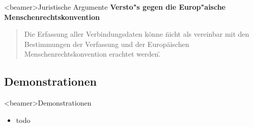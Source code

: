     \begin{frame}<beamer>{Juristische Argumente}
      \textbf{Versto"s gegen die Europ"aische Menschenrechtskonvention}
      \begin{quote}
        Die Erfassung aller Verbindungsdaten könne \"nicht als vereinbar mit den Bestimmungen der Verfassung und der Europäischen Menschenrechtskonvention erachtet werden\".

      \end{quote}
    \end{frame}

  \subsection*{Demonstrationen}
    \begin{frame}<beamer>{Demonstrationen}
      \begin{itemize}
        \item
          todo
  
      \end{itemize}
    \end{frame}
